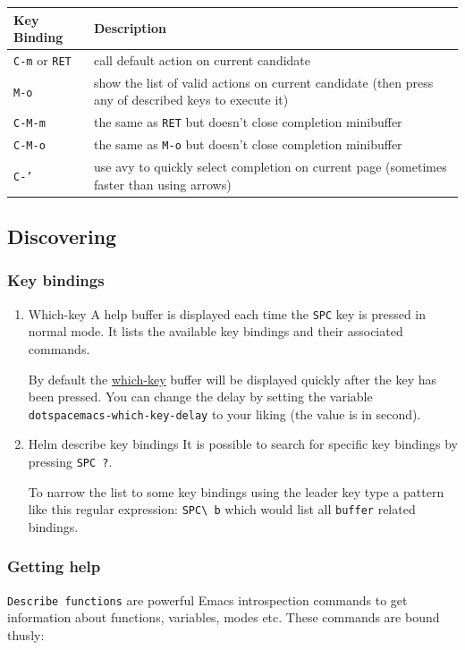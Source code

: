 \documentclass[11pt]{article}
\begin{document}
\begin{center}
\begin{tabular}{ll}
Key Binding & Description\\
\hline
\texttt{C-m} or \texttt{RET} & call default action on current candidate\\
\texttt{M-o} & show the list of valid actions on current candidate (then press any of described keys to execute it)\\
\texttt{C-M-m} & the same as \texttt{RET} but doesn't close completion minibuffer\\
\texttt{C-M-o} & the same as \texttt{M-o} but doesn't close completion minibuffer\\
\texttt{C-'} & use avy to quickly select completion on current page (sometimes faster than using arrows)\\
\end{tabular}
\end{center}

\subsection{Discovering}
\label{sec:orga987131}
\subsubsection{Key bindings}
\label{sec:org8f0b6fd}
\begin{enumerate}
\item Which-key
\label{sec:orga0c9a72}
A help buffer is displayed each time the \texttt{SPC} key is pressed in normal mode.
It lists the available key bindings and their associated commands.

By default the \href{https://github.com/justbur/emacs-which-key}{which-key} buffer will be displayed quickly after the key has been
pressed. You can change the delay by setting the variable
\texttt{dotspacemacs-which-key-delay} to your liking (the value is in second).

\item Helm describe key bindings
\label{sec:orgdd446a9}
It is possible to search for specific key bindings by pressing \texttt{SPC ?}.

To narrow the list to some key bindings using the leader key type a pattern like
this regular expression: \texttt{SPC\textbackslash{} b} which would list all \texttt{buffer} related
bindings.
\end{enumerate}

\subsubsection{Getting help}
\label{sec:org661b949}
\texttt{Describe functions} are powerful Emacs introspection commands to get
information about functions, variables, modes etc. These commands are bound
thusly:
\end{document}
